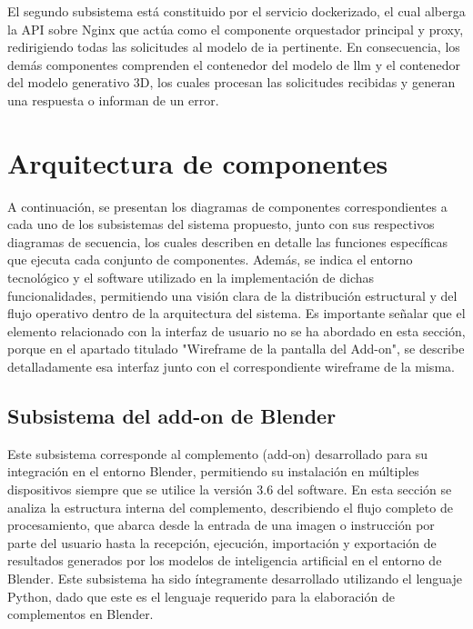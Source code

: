 El segundo subsistema está constituido por el servicio dockerizado, el cual alberga la API sobre Nginx que actúa como el componente orquestador principal y proxy, redirigiendo todas las solicitudes al modelo de \gls{ia} pertinente. En consecuencia, los demás componentes comprenden el contenedor del modelo de \gls{llm} y el contenedor del modelo generativo 3D, los cuales procesan las solicitudes recibidas y generan una respuesta o informan de un error.



\section{Arquitectura de componentes}
A continuación, se presentan los diagramas de componentes correspondientes a cada uno de los subsistemas del sistema propuesto, junto con sus respectivos diagramas de secuencia, los cuales describen en detalle las funciones específicas que ejecuta cada conjunto de componentes. Además, se indica el entorno tecnológico y el software utilizado en la implementación de dichas funcionalidades, permitiendo una visión clara de la distribución estructural y del flujo operativo dentro de la arquitectura del sistema. Es importante señalar que el elemento relacionado con la interfaz de usuario no se ha abordado en esta sección, porque en el apartado titulado "Wireframe de la pantalla del Add-on", se describe detalladamente esa interfaz junto con el correspondiente wireframe de la misma.

\subsection{Subsistema del add-on de Blender}
Este subsistema corresponde al complemento (add-on) desarrollado para su integración en el entorno Blender, permitiendo su instalación en múltiples dispositivos siempre que se utilice la versión 3.6 del software. En esta sección se analiza la estructura interna del complemento, describiendo el flujo completo de procesamiento, que abarca desde la entrada de una imagen o instrucción por parte del usuario hasta la recepción, ejecución, importación y exportación de resultados generados por los modelos de inteligencia artificial en el entorno de Blender. Este subsistema ha sido íntegramente desarrollado utilizando el lenguaje Python, dado que este es el lenguaje requerido para la elaboración de complementos en Blender.

